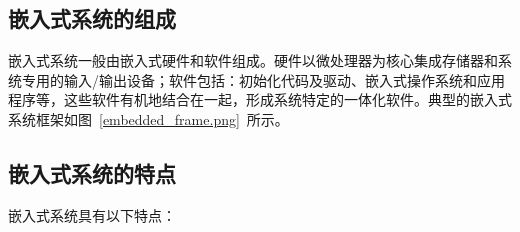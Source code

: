 \subsection{嵌入式系统的组成}
嵌{\cf}入式{\cf}系统{\cf}一般{\cf}由嵌{\cf}入式{\cf}硬件{\cf}和软{\cf}件组{\cf}成。{\cf}硬件{\cf}以微{\cf}处理{\cf}器为{\cf}核心{\cf}集成{\cf}存储{\cf}器和{\cf}系统{\cf}专用{\cf}的输{\cf}入/{\cf}输出{\cf}设备{\cf}；软{\cf}件包{\cf}括：{\cf}初始{\cf}化代{\cf}码及{\cf}驱动{\cf}、嵌{\cf}入式{\cf}操作{\cf}系统{\cf}和应{\cf}用程{\cf}序等{\cf}，这{\cf}些软{\cf}件有{\cf}机地{\cf}结合{\cf}在一{\cf}起，{\cf}形成{\cf}系统{\cf}特定{\cf}的一{\cf}体化{\cf}软件。典型的嵌入式系统框架如图~\ref{embedded_frame.png}~所示。

\subsection{嵌入式系统的特点}
嵌{\cf}入式{\cf}系统{\cf}具有{\cf}以下特点：
